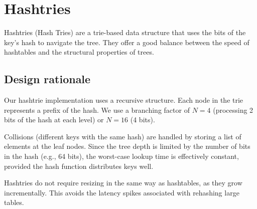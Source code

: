 \chapter{Hashtries}\label{chap:hashtries}

Hashtries (Hash Tries) are a trie-based data structure that uses the bits of the key's hash to navigate the tree. They offer a good balance between the speed of hashtables and the structural properties of trees.

\section{Design rationale}

Our hashtrie implementation uses a recursive structure. Each node in the trie represents a prefix of the hash. We use a branching factor of $N=4$ (processing 2 bits of the hash at each level) or $N=16$ (4 bits).

Collisions (different keys with the same hash) are handled by storing a list of elements at the leaf nodes. Since the tree depth is limited by the number of bits in the hash (e.g., 64 bits), the worst-case lookup time is effectively constant, provided the hash function distributes keys well.

Hashtries do not require resizing in the same way as hashtables, as they grow incrementally. This avoids the latency spikes associated with rehashing large tables.
